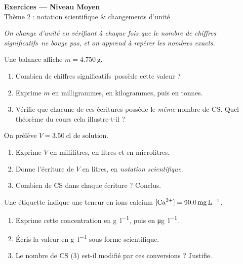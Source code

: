 \documentclass[11pt,a4paper]{article}
\newcommand{\CS}{chiffres significatifs}
\begin{document}
\begin{center}
{\Large\bfseries\color{primarydark} Exercices — Niveau Moyen}\\[1pt]
{\color{primary} Thème 2 : notation scientifique \& changements d'unité}
\end{center}
\vspace{1mm}
\textit{On change d'unité en vérifiant à chaque fois que le nombre de \CS\ ne bouge pas, et on
apprend à repérer les nombres exacts.}
\vspace{2mm}

\begin{exo}
Une balance affiche $m = \qty{4,750}{\gram}$.
\begin{enumerate}[label=\alph*),leftmargin=1.6em,itemsep=1pt]
  \item Combien de \CS\ possède cette valeur ?
  \item Exprime $m$ en milligrammes, en kilogrammes, puis en tonnes.
  \item Vérifie que chacune de ces écritures possède le \emph{même} nombre de CS. Quel théorème
        du cours cela illustre-t-il ?
\end{enumerate}
\end{exo}

\begin{exo}
On prélève $V = \qty{3,50}{\centi\litre}$ de solution.
\begin{enumerate}[label=\alph*),leftmargin=1.6em,itemsep=1pt]
  \item Exprime $V$ en millilitres, en litres et en microlitres.
  \item Donne l'écriture de $V$ en litres, en \emph{notation scientifique}.
  \item Combien de CS dans chaque écriture ? Conclus.
\end{enumerate}
\end{exo}

\begin{exo}
Une étiquette indique une teneur en ions calcium $[\ce{Ca^{2+}}] = \qty{90,0}{\milli\gram\per\litre}$.
\begin{enumerate}[label=\alph*),leftmargin=1.6em,itemsep=1pt]
  \item Exprime cette concentration en \si{\gram\per\litre}, puis en \si{\micro\gram\per\litre}.
  \item Écris la valeur en \si{\gram\per\litre} sous forme scientifique.
  \item Le nombre de CS ($3$) est-il modifié par ces conversions ? Justifie.
\end{enumerate}
\end{exo}
\end{document}
